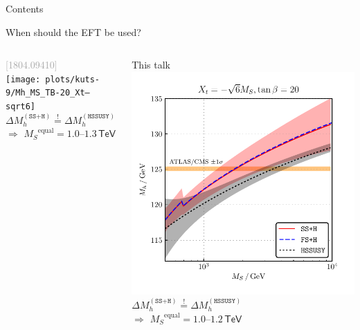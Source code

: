 \documentclass[hyperref={pdfpagelabels=false},ngerman]{beamer}
\newcommand{\eh}[1]{\,\mathsf{#1}}
\newcommand{\TeV}{\eh{TeV}}
\newcommand{\MS}{\ensuremath{M_S}}
\newcommand{\bigcite}[1]{\textcolor{darkgray}{[#1]}}
\newcommand{\DMh}{\ensuremath{\Delta M_h^{(\texttt{SS+H})}}}
\newcommand{\DMhHSSUSY}{\ensuremath{\Delta M_h^{(\HSSUSY)}}}
\def\HSSUSY{\texttt{HSSUSY}}
\begin{document}
\begin{frame}{Contents}
  \tableofcontents[currentsection]
\end{frame}

\begin{frame}{When should the EFT be used?}
  \begin{columns}
    \begin{column}{0.5\textwidth}
      \centering
      \bigcite{1804.09410}\\
      \texttt{[image: plots/kuts-9/Mh\_MS\_TB-20\_Xt--sqrt6]}\\
      $\DMh \overset{!}{=} \DMhHSSUSY$\\[0.5em]
      $\Rightarrow$ $\MS^{\text{equal}} = 1.0$--$1.3\TeV$
    \end{column}
    \begin{column}{0.5\textwidth}
      \centering
      This talk\\
      \includegraphics[width=\textwidth]{plots/kuts-10/DMh_MS_combined}\\
      $\DMh \overset{!}{=} \DMhHSSUSY$\\[0.5em]
      $\Rightarrow$ $\MS^{\text{equal}} = 1.0$--$1.2\TeV$
    \end{column}
  \end{columns}
\end{frame}
\end{document}
